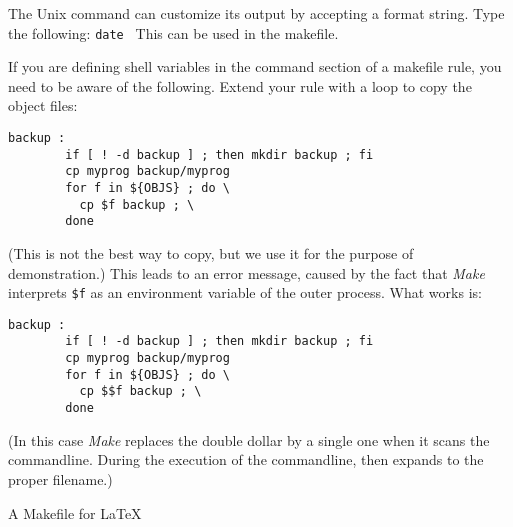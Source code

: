 The Unix  command can customize its output by accepting a
format string. Type the following: 
%
\verb+date +%
%
This can be used in the makefile.


If you are defining shell variables in the command section of a
makefile rule, you need to be aware of the following. Extend your
 rule with a loop to copy the object files:
\begin{verbatim}
backup :
        if [ ! -d backup ] ; then mkdir backup ; fi
        cp myprog backup/myprog
        for f in ${OBJS} ; do \
          cp $f backup ; \
        done
\end{verbatim}
(This is not the best way to copy, but we use it for the purpose of
demonstration.) This leads to an error message, caused by the fact
that \emph{Make} interprets \verb+$f+ as an environment variable of
the outer process. What works is:
\begin{verbatim}
backup :
        if [ ! -d backup ] ; then mkdir backup ; fi
        cp myprog backup/myprog
        for f in ${OBJS} ; do \
          cp $$f backup ; \
        done
\end{verbatim}
(In this case \emph{Make} replaces the double dollar by a single one
when it scans the commandline. During the execution of the
commandline,  then expands to the proper filename.)

\Level 0 {A Makefile for \LaTeX}
\label{sec:latex-make}


